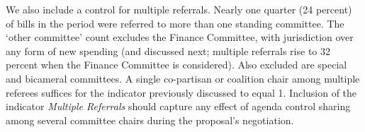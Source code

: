 \documentclass[letter,12pt]{article}
\newcommand{\mc}{\multicolumn}
\begin{document}
\begin{table}
\end{table}

We also include a control for multiple referrals. Nearly one quarter (24 percent) of bills in the period were referred to more than one standing committee. The `other committee' count excludes the Finance Committee, with jurisdiction over any form of new spending (and discussed next; multiple referrals rise to 32 percent when the Finance Committee is considered). Also excluded are special and bicameral committees. A single co-partisan or coalition chair among multiple referees suffices for the indicator previously discussed to equal 1. Inclusion of the indicator \emph{Multiple Referrals} should capture any effect of agenda control sharing among several committee chairs during the proposal's negotiation. 
\end{document}
